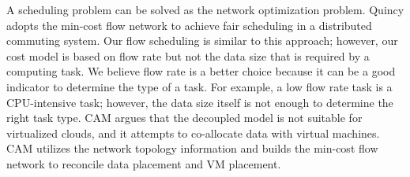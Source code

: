 A scheduling problem can be solved as the network optimization problem.
Quincy \cite{IsardM2009_Quincy} adopts the min-cost flow network to achieve fair scheduling in a distributed commuting system.
Our flow scheduling is similar to this approach; however, our cost model is based on flow rate but not the data size that is required by a computing task.
We believe flow rate is a better choice because it can be a good indicator to determine the type of a task.
For example, a low flow rate task is a CPU-intensive task; however, the data size itself is not enough to determine the right task type.
CAM \cite{LiM2012_CAM} argues that the decoupled model is not suitable for virtualized clouds, and it attempts to co-allocate data with virtual machines.
CAM utilizes the network topology information and builds the min-cost flow network to reconcile data placement and VM placement.
